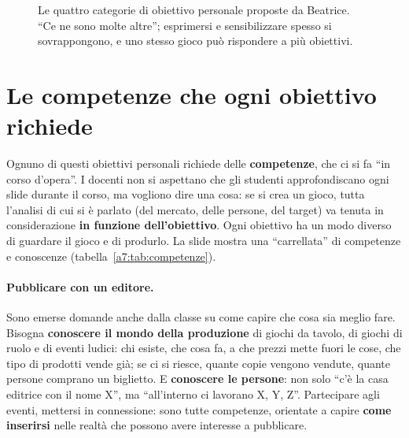 \begin{figure}[htbp]
\centering
{}
\caption{Le quattro categorie di obiettivo personale proposte da Beatrice. ``Ce
ne sono molte altre''; esprimersi e sensibilizzare spesso si sovrappongono, e uno
stesso gioco può rispondere a più obiettivi.}
\label{a7:fig:obiettivi}
\end{figure}

\section{Le competenze che ogni obiettivo richiede}
\label{a7:sec:competenze}

Ognuno di questi obiettivi personali richiede delle \textbf{competenze}, che ci si
fa ``in corso d'opera''. I docenti non si aspettano che gli studenti approfondiscano
ogni slide durante il corso, ma vogliono dire una cosa: se si crea un gioco, tutta
l'analisi di cui si è parlato (del mercato, delle persone, del target) va tenuta in
considerazione \textbf{in funzione dell'obiettivo}. Ogni obiettivo ha un modo
diverso di guardare il gioco e di produrlo. La slide mostra una ``carrellata'' di
competenze e conoscenze (tabella~\ref{a7:tab:competenze}).

\paragraph{Pubblicare con un editore.} Sono emerse domande anche dalla classe su come
capire che cosa sia meglio fare. Bisogna \textbf{conoscere il mondo della produzione}
di giochi da tavolo, di giochi di ruolo e di eventi ludici: chi esiste, che cosa fa,
a che prezzi mette fuori le cose, che tipo di prodotti vende già; se ci si riesce,
quante copie vengono vendute, quante persone comprano un biglietto. E
\textbf{conoscere le persone}: non solo ``c'è la casa editrice con il nome X'', ma
``all'interno ci lavorano X, Y, Z''. Partecipare agli eventi, mettersi in
connessione: sono tutte competenze, orientate a capire \textbf{come inserirsi} nelle
realtà che possono avere interesse a pubblicare.

